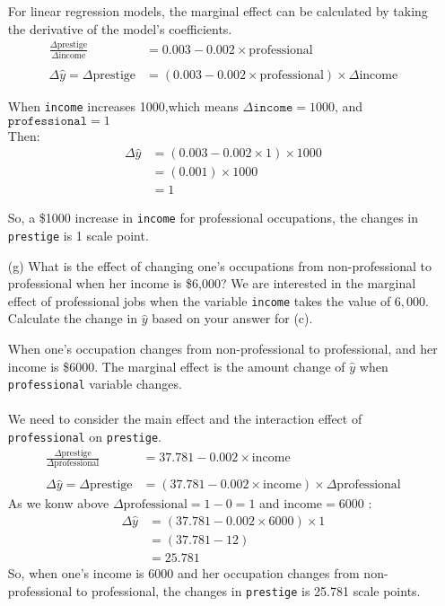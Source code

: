 \documentclass[12pt,letterpaper]{article}
\begin{document}
\begin{enumerate}
	\vspace{.10cm}
	
	\noindent For linear regression models, the marginal effect can be calculated by taking the derivative of the model's coefficients. 
	\begin{align*}
		\frac{\Delta \text{prestige}}{\Delta \text{income}} &= 0.003 - 0.002 \times \text{professional} \\\\
		\Delta \hat{y} = \Delta \text{prestige} &= (0.003 - 0.002 \times \text{professional}) \times \Delta \text{income}
	\end{align*}
	
	\noindent When \texttt{income} increases 1000,which means \(\Delta \texttt{income} = 1000\), and \(\texttt{professional} = 1\) \\Then:
	\begin{align*}
		\Delta \hat{y} &= (0.003 - 0.002 \times 1) \times 1000 \\
		&= (0.001) \times 1000 \\
		&= 1
	\end{align*}
	
	\noindent So, a \$1000 increase in \texttt{income} for professional occupations, the changes in  \texttt{prestige} is 1 scale point.
	
	\item [(g)]
	What is the effect of changing one's occupations from non-professional to professional when her income is \$6,000? We are interested in the marginal effect of professional jobs when the variable \texttt{income} takes the value of $6,000$. Calculate the change in $\hat{y}$ based on your answer for (c).
	
	\noindent When one's occupation changes from non-professional to professional, and her income is \$6000. The marginal effect is the amount change of $\hat{y}$ when \texttt{professional} variable changes.\\\\ We need to consider the main effect and the interaction effect of \texttt{professional} on \texttt{prestige}.
	\begin{align*}
		\frac{\Delta \text{prestige}}{\Delta \text{professional}} &= 37.781 - 0.002 \times \text{income} \\\\
		\Delta \hat{y} = \Delta \text{prestige} &=  (37.781 - 0.002 \times \text{income})\times \Delta \text{professional}
	\end{align*}
	\noindent As we konw above \(\Delta \text{professional}=1-0=1\) and \(\text{income}=6000\) :
	\begin{align*}
		\Delta \hat{y} &= (37.781 - 0.002 \times 6000) \times 1 \\
		&= (37.781 - 12) \\
		&= 25.781
	\end{align*}
	\noindent So, when one's income is 6000 and her occupation changes from non-professional to professional, the changes in \texttt{prestige} is 25.781 scale points. 
\end{enumerate}
\end{document}
